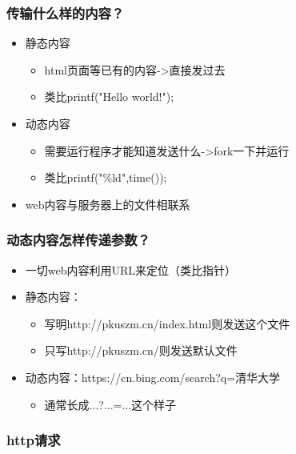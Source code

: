 \documentclass[12pt,AutoFakeBold,aspectratio=43,mathserif]{beamer}
\begin{document}
{\begin{frame}
    \end{frame}

    \begin{frame}
        \frametitle{传输什么样的内容？}
    
        \begin{itemize}
            \item 静态内容\begin{itemize}
                \item html页面等已有的内容->直接发过去
                \item 类比printf("Hello world!");
            \end{itemize}
            \item 动态内容\begin{itemize}
                \item 需要运行程序才能知道发送什么->fork一下并运行
                \item 类比printf("\%ld",time());
            \end{itemize}
            \item web内容与服务器上的文件相联系
        \end{itemize}
    
    \end{frame}

    \begin{frame}
        \frametitle{动态内容怎样传递参数？}
    
        \begin{itemize}
            \item 一切web内容利用URL来定位（类比指针）
            \item 静态内容：\begin{itemize}
                \item 写明http://pkuszm.cn/index.html则发送这个文件
                \item 只写http://pkuszm.cn/则发送默认文件
            \end{itemize}
            \item 动态内容：https://cn.bing.com/search?q=清华大学\begin{itemize}
                \item 通常长成...?...=...这个样子
            \end{itemize}
        \end{itemize}
    
    \end{frame}

    \begin{frame}
        \frametitle{http请求}
    

\end{frame}}
\end{document}
